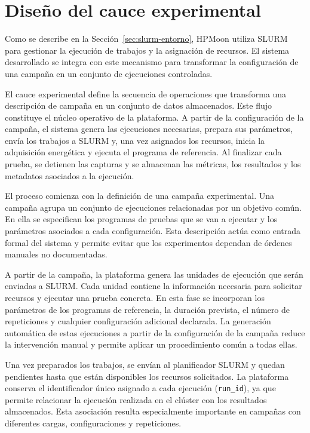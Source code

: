 \section{Diseño del cauce experimental}
\label{sec:pipeline-implementacion}

Como se describe en la Sección~\ref{sec:slurm-entorno}, HPMoon utiliza SLURM para gestionar la ejecución de trabajos y la asignación de recursos. El sistema desarrollado se integra con este mecanismo para transformar la configuración de una campaña en un conjunto de ejecuciones controladas.

El cauce experimental define la secuencia de operaciones que transforma una descripción de campaña en un conjunto de datos almacenados. Este flujo constituye el núcleo operativo de la plataforma. A partir de la configuración de la campaña, el sistema genera las ejecuciones necesarias, prepara sus parámetros, envía los trabajos a SLURM y, una vez asignados los recursos, inicia la adquisición energética y ejecuta el programa de referencia. Al finalizar cada prueba, se detienen las capturas y se almacenan las métricas, los resultados y los metadatos asociados a la ejecución.

El proceso comienza con la definición de una campaña experimental. Una campaña agrupa un conjunto de ejecuciones relacionadas por un objetivo común. En ella se especifican los programas de pruebas que se van a ejecutar y los parámetros asociados a cada configuración. Esta descripción actúa como entrada formal del sistema y permite evitar que los experimentos dependan de órdenes manuales no documentadas.

A partir de la campaña, la plataforma genera las unidades de ejecución que serán enviadas a SLURM. Cada unidad contiene la información necesaria para solicitar recursos y ejecutar una prueba concreta. En esta fase se incorporan los parámetros de los programas de referencia, la duración prevista, el número de repeticiones y cualquier configuración adicional declarada. La generación automática de estas ejecuciones a partir de la configuración de la campaña reduce la intervención manual y permite aplicar un procedimiento común a todas ellas.

Una vez preparados los trabajos, se envían al planificador SLURM y quedan pendientes hasta que están disponibles los recursos solicitados. La plataforma conserva el identificador único asignado a cada ejecución (\texttt{run\_id}), ya que permite relacionar la ejecución realizada en el clúster con los resultados almacenados. Esta asociación resulta especialmente importante en campañas con diferentes cargas, configuraciones y repeticiones.

